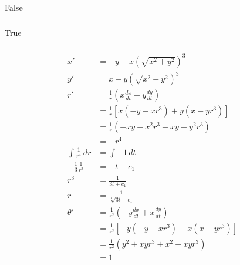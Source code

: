 \documentclass{article}
\begin{document}
False

\setcounter{subsubsection}{8}
\subsubsection{}

True

\setcounter{subsubsection}{10}
\subsubsection{}

\begin{align*}
  x'                         & = -y - x (\sqrt{x^2 + y^2})^3                                         \\
  y'                         & = x - y (\sqrt{x^2 + y^2})^3                                          \\
  r'                         & = \frac{1}{r} \left( x \frac{d x}{d t} + y \frac{d y}{d t} \right)    \\
                             & = \frac{1}{r} [x (-y - x r^3) + y (x - y r^3)]                        \\
                             & = \frac{1}{r} (-x y - x^2 r^3 + x y - y^2 r^3)                        \\
                             & = -r^4                                                                \\
  \int \frac{1}{r^4} \,dr    & = \int -1 \,dt                                                        \\
  -\frac{1}{3} \frac{1}{r^3} & = -t + c_1                                                            \\
  r^3                        & = \frac{1}{3 t + c_1}                                                 \\
  r                          & = \frac{1}{\sqrt[3]{3 t + c_1}}                                       \\
  \theta'                    & = \frac{1}{r^2} \left( -y \frac{d x}{d t} + x \frac{d y}{d t} \right) \\
                             & = \frac{1}{r^2} [-y (-y -x r^3) + x (x - y r^3)]                      \\
                             & = \frac{1}{r^2} (y^2 + x y r^3 + x^2 - x y r^3)                       \\
                             & = 1                                                                   \\

\end{align*}
\end{document}

